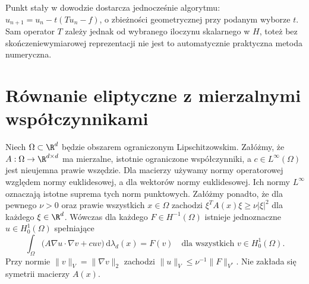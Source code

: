 \begin{uwaga}
Punkt stały w dowodzie dostarcza jednocześnie algorytmu:
$u_{n+1}=u_n-t(Tu_n-f)$, o zbieżności geometrycznej
przy podanym wyborze $t$. Sam operator $T$ zależy jednak
od wybranego iloczynu skalarnego w $H$, toteż bez
skończeniewymiarowej reprezentacji nie jest to automatycznie
praktyczna metoda numeryczna.
\end{uwaga}

\section{Równanie eliptyczne z mierzalnymi współczynnikami}
\label{sec:pde11-elliptic}

\begin{twierdzenie}
\label{thm:pde11-elliptic}
Niech $\Omega\subset\R^d$ będzie obszarem ograniczonym Lipschitzowskim. Załóżmy, że $A:\Omega\to\R^{d\times d}$
ma mierzalne, istotnie ograniczone współczynniki,
a $c\in L^\infty(\Omega)$ jest nieujemna prawie wszędzie.
Dla macierzy używamy normy operatorowej względem
normy euklidesowej, a dla wektorów normy euklidesowej.
Ich normy $L^\infty$ oznaczają istotne suprema
tych norm punktowych.
Załóżmy ponadto, że dla pewnego $\nu>0$ oraz
prawie wszystkich $x\in\Omega$ zachodzi
$\xi^TA(x)\xi\ge\nu|\xi|^2$ dla każdego $\xi\in\R^d$.
Wówczas dla każdego $F\in H^{-1}(\Omega)$ istnieje
jednoznaczne $u\in H_0^1(\Omega)$ spełniające
\[
\int_\Omega\big(A\nabla u\cdot\nabla v+cuv\big)
\,\mathrm d\lambda_d(x)=F(v)
\quad\text{dla wszystkich }v\in H_0^1(\Omega).
\]
Przy normie $\|v\|_V=\|\nabla v\|_2$ zachodzi
$\|u\|_V\le\nu^{-1}\|F\|_{V^*}$.
Nie zakłada się symetrii macierzy $A(x)$.
\end{twierdzenie}
